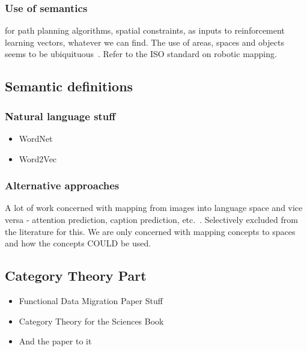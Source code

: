 \documentclass[a4paper,12pt]{article}
\theoremstyle{mytheor}
\begin{document}
\subsubsection{Use of semantics}
for path planning algorithms, spatial constraints, as inputs to reinforcement learning vectors, whatever we can find. The use of areas, spaces and objects seems to be ubiquituous~\cite{galindo_robot_2008,anderson_evaluation_2018,kostavelis_semantic_2015,kuipers_spatial_2000}. Refer to the ISO standard on robotic mapping.
\subsection{Semantic definitions}
\subsubsection{Natural language stuff}
\begin{itemize}
    \item WordNet~\cite{fellbaum_nouns_1998,budanitsky_evaluating_2006}
    \item Word2Vec~\cite{bojanowski_enriching_2016}
\end{itemize}
\subsubsection{Alternative approaches}
A lot of work concerned with mapping from images into language space and vice versa - attention prediction, caption prediction, etc.~\cite{barnard_computational_2016}. Selectively excluded from the literature for this. We are only concerned with mapping concepts to spaces and how the concepts COULD be used.
\subsection{Category Theory Part}
\begin{itemize}
    \item Functional Data Migration Paper Stuff~\cite{spivak_functorial_2013}
    \item Category Theory for the Sciences Book~\cite{david_i_spivak_category_2014}
    \item And the paper to it~\cite{spivak_ologs_2012}
\end{itemize}



\end{document}
